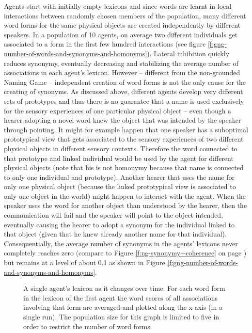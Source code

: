 Agents start with initially empty lexicons and since words are learnt
in local interactions between randomly chosen members of the
population, many different word forms for the same physical objects
are created independently by different speakers. In a population of 10
agents, on average two different individuals get associated to a form
in the first few hundred interactions (see figure
\ref{f:gng-number-of-words-and-synonyms-and-homonyms}). Lateral
inhibition quickly reduces synonymy, eventually decreasing and
stabilizing the average number of associations in each agent's
lexicon. However -- different from the non-grounded Naming Game --
independent creation of word forms is not the only cause for the
creating of synonyms. As discussed above, different agents develop
very different sets of prototypes and thus there is no guarantee that
a name is used exclusively for the sensory experiences of one
particular physical object -- even though a hearer adopting a novel
word knew the object that was intended by the speaker through
pointing. It might for example happen that one speaker has a
suboptimal prototypical view that gets associated to the sensory
experiences of two different physical objects in different sensory
contexts. Therefore the word connected to that prototype and linked
individual would be used by the agent for different physical objects
(note that his is not homonymy because that name is connected to only
one individual and prototype). Another hearer that uses the name for
only one physical object (because the linked prototypical view is
associated to only one object in the world) might happen to interact
with the agent. When the speaker uses the word for another object than
understood by the hearer, then the communication will fail and the
speaker will point to the object intended, eventually causing the
hearer to adopt a synonym for the individual linked to that object
(given that he knew already another name for that individual).
Consequentially, the average number of synonyms in the agents'
lexicons never completely reaches zero (compare to Figure
\ref{f:ng-synonymy+coherence} on page
\pageref{f:ng-synonymy+coherence}) but remains at a level of about 0.1
as shown in Figure
\ref{f:gng-number-of-words-and-synonyms-and-homonyms}.

\begin{figure}[t]
  \caption{A single agent's lexicon as it changes over time. For each
    word form in the lexicon of the first agent the word scores of all
    associations involving that form are averaged and plotted along
    the x-axis (in a single run). The population size for this graph
    is limited to five in order to restrict the number of word forms.}
  \label{f:gng-evolution-of-word-scores}
\end{figure}

